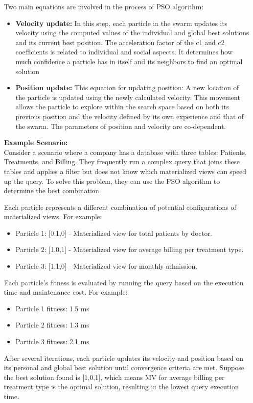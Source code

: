 Two main equations are involved in the process of PSO algorithm:
\begin{itemize}
    \item \textbf{Velocity update:} In this step, each particle in the swarm updates its velocity using the computed values of the individual and global best solutions and its current best position. The acceleration factor of the c1 and c2 coefficients is related to individual and social aspects. It determines how much confidence a particle has in itself and its neighbors to find an optimal solution \cite{baeldung2024pso}

    
    
    \item \textbf{Position update:} This equation for updating position: A new location of the particle is updated using the newly calculated velocity. This movement allows the particle to explore within the search space based on both its previous position and the velocity defined by its own experience and that of the swarm. The parameters of position and velocity are co-dependent.
    
    

\end{itemize} 

\textbf{Example Scenario:}\\
Consider a scenario where a company has a database with three tables: Patients, Treatments, and Billing. They frequently run a complex query that joins these tables and applies a filter but does not know which materialized views can speed up the query. To solve this problem, they can use the PSO algorithm to determine the best combination. 

 Each particle represents a different combination of potential configurations of materialized views. For example:

 \begin{itemize}
     \item Particle 1: [0,1,0] - Materialized view for total patients by doctor.
     \item Particle 2: [1,0,1] - Materialized view for average billing per treatment type.
     \item Particle 3: [1,1,0] - Materialized view for monthly admission.
 \end{itemize}

Each particle's fitness is evaluated by running the query based on the execution time and maintenance cost. For example:

\begin{itemize}
     \item Particle 1 fitness: 1.5 ms
     \item Particle 2 fitness: 1.3 ms
     \item Particle 3 fitness: 2.1 ms
 \end{itemize}
 
After several iterations, each particle updates its velocity and position based on its personal and global best solution until convergence criteria are met. Suppose the best solution found is [1,0,1], which means MV for average billing per treatment type is the optimal solution, resulting in the lowest query execution time.

